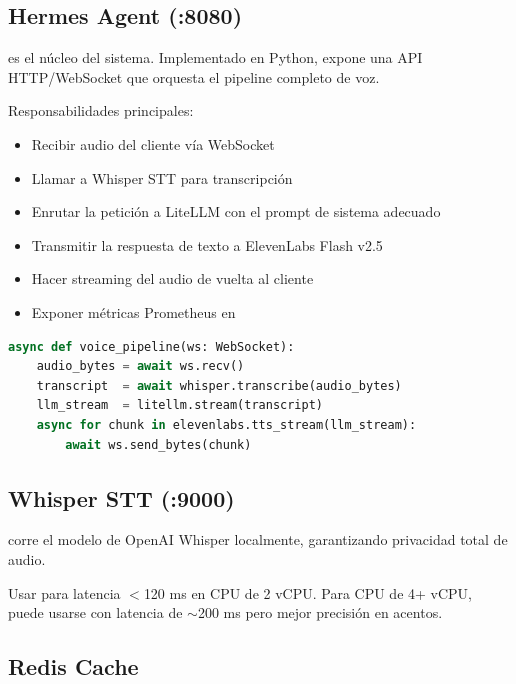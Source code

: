 \subsection{Hermes Agent (:8080)}

 es el núcleo del sistema. Implementado en Python,
expone una API HTTP/WebSocket que orquesta el pipeline completo de voz.

Responsabilidades principales:
\begin{itemize}
  \item Recibir audio del cliente vía WebSocket
  \item Llamar a Whisper STT para transcripción
  \item Enrutar la petición a LiteLLM con el prompt de sistema adecuado
  \item Transmitir la respuesta de texto a ElevenLabs Flash v2.5
  \item Hacer streaming del audio de vuelta al cliente
  \item Exponer métricas Prometheus en 
\end{itemize}

\begin{lstlisting}[language=python,caption=Fragmento ilustrativo — pipeline de voz]
async def voice_pipeline(ws: WebSocket):
    audio_bytes = await ws.recv()
    transcript  = await whisper.transcribe(audio_bytes)
    llm_stream  = litellm.stream(transcript)
    async for chunk in elevenlabs.tts_stream(llm_stream):
        await ws.send_bytes(chunk)
\end{lstlisting}

\subsection{Whisper STT (:9000)}

 corre el modelo  de OpenAI Whisper
localmente, garantizando privacidad total de audio.

\begin{infobox}
Usar  para latencia $<$120 ms en CPU de 2 vCPU.
Para CPU de 4+ vCPU,  puede usarse con latencia de $\sim$200 ms
pero mejor precisión en acentos.
\end{infobox}

\subsection{Redis Cache}

